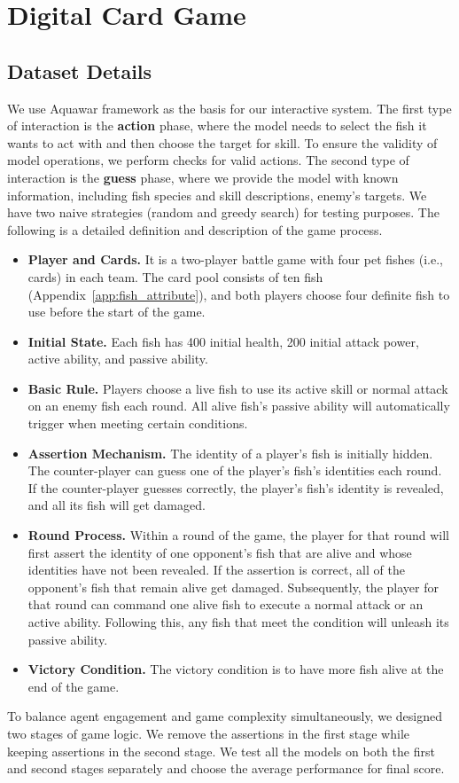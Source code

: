 \section{Digital Card Game} \label{app:dcg}
\subsection{Dataset Details}
We use Aquawar framework as the basis for our interactive system. The first type of interaction is the \textbf{action} phase, where the model needs to select the fish it wants to act with and then choose the target for skill. To ensure the validity of model operations, we perform checks for valid actions. The second type of interaction is the \textbf{guess} phase, where we provide the model with known information, including fish species and skill descriptions, enemy's targets. We have two naive strategies (random and greedy search) for testing purposes. The following is a detailed definition and description of the game process.

\begin{itemize}[leftmargin=1.5em,itemsep=0pt,parsep=0.2em,topsep=0.0em,partopsep=0.0em]
    \item \textbf{Player and Cards.} It is a two-player battle game with four pet fishes (i.e., cards) in each team. The card pool consists of ten fish (Appendix~\ref{app:fish_attribute}), and both players choose four definite fish to use before the start of the game.
    \item \textbf{Initial State.} Each fish has 400 initial health, 200 initial attack power, active ability, and passive ability.
    \item \textbf{Basic Rule.} Players choose a live fish to use its active skill or normal attack on an enemy fish each round. All alive fish's passive ability will automatically trigger when meeting certain conditions.
    \item \textbf{Assertion Mechanism.} The identity of a player's fish is initially hidden. The counter-player can guess one of the player's fish's identities each round. If the counter-player guesses correctly, the player's fish's identity is revealed, and all its fish will get damaged.
    \item \textbf{Round Process.} Within a round of the game, the player for that round will first assert the identity of one opponent's fish that are alive and whose identities have not been revealed. If the assertion is correct, all of the opponent's fish that remain alive get damaged. Subsequently, the player for that round can command one alive fish to execute a normal attack or an active ability. Following this, any fish that meet the condition will unleash its passive ability.
    \item \textbf{Victory Condition.} The victory condition is to have more fish alive at the end of the game.
\end{itemize}
To balance agent engagement and game complexity simultaneously, we designed two stages of game logic. We remove the assertions in the first stage while keeping assertions in the second stage. We test all the models on both the first and second stages separately and choose the average performance for final score.

